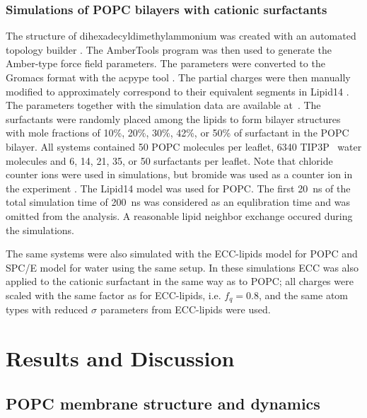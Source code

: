 \documentclass[aip,jcp,twocolumn]{revtex4}
\begin{document}
\subsubsection{Simulations of POPC bilayers with cationic surfactants}
The structure of dihexadecyldimethylammonium
was created with an automated topology builder \cite{malde11}. 
The AmberTools program \cite{amber} was then used to generate the Amber-type force field
parameters. The parameters were converted to the Gromacs format with
the acpype tool \cite{acpype}. The partial charges were then manually modified
to approximately correspond to their equivalent segments in Lipid14 \cite{dickson14}.
The parameters together with the simulation data are available
at~\cite{POPClipid14T313K,POPClipid1410perCATsurfT313K,POPClipid1420perCATsurfT313K,POPClipid1430perCATsurfT313K,POPClipid1442perCATsurfT313K,POPClipid1450perCATsurfT313K}.
The surfactants were randomly placed among the lipids to form bilayer structures with
mole fractions of 10\%, 20\%, 30\%, 42\%, or 50\% of surfactant in the POPC bilayer.
All systems contained 50 POPC molecules per leaflet, 6340 TIP3P~\cite{jorgensen83} water molecules and
6, 14, 21, 35, or 50 surfactants per leaflet. 
Note that chloride counter ions were used in simulations, 
but bromide was used as a counter ion in the experiment \cite{scherer89}.
The Lipid14 model was used for POPC.
The first 20~ns of the total simulation time of 200~ns
was considered as an equlibration time and was omitted from the analysis.
A reasonable lipid neighbor exchange occured during the simulations.


The same systems were also simulated with the ECC-lipids model for POPC 
and SPC/E model for water using the same setup.
In these simulations ECC was also applied to the cationic surfactant 
in the same way as to POPC;
all charges were scaled with the same factor as for ECC-lipids, i.e. $f_q=0.8$, 
and the same atom types with reduced $\sigma$ parameters from ECC-lipids were used. 

\section{Results and Discussion}

\subsection{POPC membrane structure and dynamics}
\end{document}
